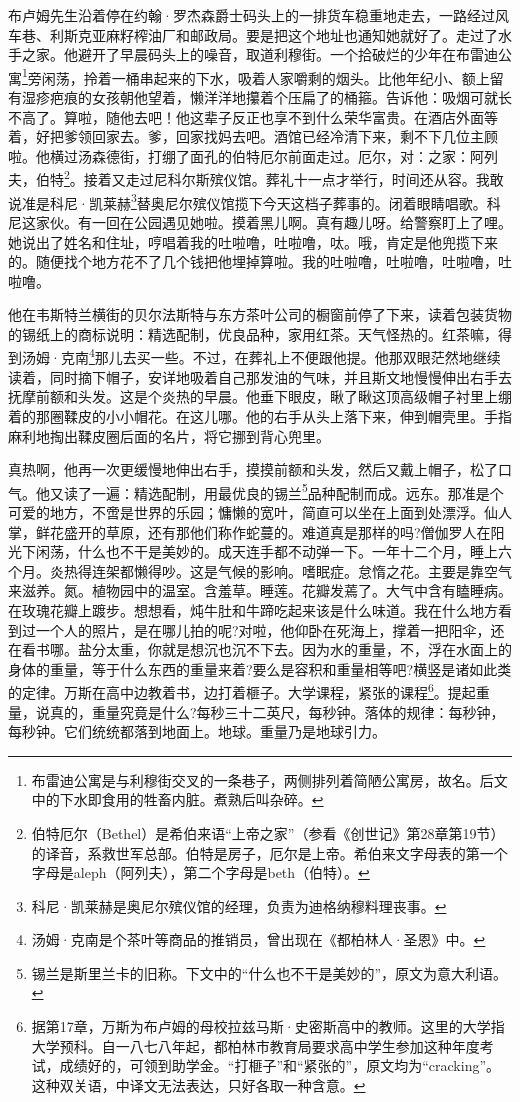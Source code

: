 \par 布卢姆先生沿着停在约翰·罗杰森爵士码头上的一排货车稳重地走去，一路经过风车巷、利斯克亚麻籽榨油厂和邮政局。要是把这个地址也通知她就好了。走过了水手之家。他避开了早晨码头上的噪音，取道利穆街。一个拾破烂的少年在布雷迪公寓\footnote{布雷迪公寓是与利穆街交叉的一条巷子，两侧排列着简陋公寓房，故名。后文中的下水即食用的牲畜内脏。煮熟后叫杂碎。}旁闲荡，拎着一桶串起来的下水，吸着人家嚼剩的烟头。比他年纪小、额上留有湿疹疤痕的女孩朝他望着，懒洋洋地攥着个压扁了的桶箍。告诉他：吸烟可就长不高了。算啦，随他去吧！他这辈子反正也享不到什么荣华富贵。在酒店外面等着，好把爹领回家去。爹，回家找妈去吧。酒馆已经冷清下来，剩不下几位主顾啦。他横过汤森德街，打绷了面孔的伯特厄尔前面走过。厄尔，对：之家：阿列夫，伯特\footnote{伯特厄尔（Bethel）是希伯来语“上帝之家”（参看《创世记》第28章第19节）的译音，系救世军总部。伯特是房子，厄尔是上帝。希伯来文字母表的第一个字母是aleph（阿列夫），第二个字母是beth（伯特）。}。接着又走过尼科尔斯殡仪馆。葬礼十一点才举行，时间还从容。我敢说准是科尼·凯莱赫\footnote{科尼·凯莱赫是奥尼尔殡仪馆的经理，负责为迪格纳穆料理丧事。}替奥尼尔殡仪馆揽下今天这档子葬事的。闭着眼睛唱歌。科尼这家伙。有一回在公园遇见她啦。摸着黑儿啊。真有趣儿呀。给警察盯上了哩。她说出了姓名和住址，哼唱着我的吐啦噜，吐啦噜，呔。哦，肯定是他兜揽下来的。随便找个地方花不了几个钱把他埋掉算啦。我的吐啦噜，吐啦噜，吐啦噜，吐啦噜。
\par 他在韦斯特兰横街的贝尔法斯特与东方茶叶公司的橱窗前停了下来，读着包装货物的锡纸上的商标说明：精选配制，优良品种，家用红茶。天气怪热的。红茶嘛，得到汤姆·克南\footnote{汤姆·克南是个茶叶等商品的推销员，曾出现在《都柏林人·圣恩》中。}那儿去买一些。不过，在葬礼上不便跟他提。他那双眼茫然地继续读着，同时摘下帽子，安详地吸着自己那发油的气味，并且斯文地慢慢伸出右手去抚摩前额和头发。这是个炎热的早晨。他垂下眼皮，瞅了瞅这顶高级帽子衬里上绷着的那圈鞣皮的小小帽花。在这儿哪。他的右手从头上落下来，伸到帽壳里。手指麻利地掏出鞣皮圈后面的名片，将它挪到背心兜里。
\par 真热啊，他再一次更缓慢地伸出右手，摸摸前额和头发，然后又戴上帽子，松了口气。他又读了一遍：精选配制，用最优良的锡兰\footnote{锡兰是斯里兰卡的旧称。下文中的“什么也不干是美妙的”，原文为意大利语。}品种配制而成。远东。那准是个可爱的地方，不啻是世界的乐园；慵懒的宽叶，简直可以坐在上面到处漂浮。仙人掌，鲜花盛开的草原，还有那他们称作蛇蔓的。难道真是那样的吗?僧伽罗人在阳光下闲荡，什么也不干是美妙的。成天连手都不动弹一下。一年十二个月，睡上六个月。炎热得连架都懒得吵。这是气候的影响。嗜眠症。怠惰之花。主要是靠空气来滋养。氮。植物园中的温室。含羞草。睡莲。花瓣发蔫了。大气中含有瞌睡病。在玫瑰花瓣上踱步。想想看，炖牛肚和牛蹄吃起来该是什么味道。我在什么地方看到过一个人的照片，是在哪儿拍的呢?对啦，他仰卧在死海上，撑着一把阳伞，还在看书哪。盐分太重，你就是想沉也沉不下去。因为水的重量，不，浮在水面上的身体的重量，等于什么东西的重量来着?要么是容积和重量相等吧?横竖是诸如此类的定律。万斯在高中边教着书，边打着榧子。大学课程，紧张的课程\footnote{据第17章，万斯为布卢姆的母校拉兹马斯·史密斯高中的教师。这里的大学指大学预科。自一八七八年起，都柏林市教育局要求高中学生参加这种年度考试，成绩好的，可领到助学金。“打榧子”和“紧张的”，原文均为“cracking”。这种双关语，中译文无法表达，只好各取一种含意。}。提起重量，说真的，重量究竟是什么?每秒三十二英尺，每秒钟。落体的规律：每秒钟，每秒钟。它们统统都落到地面上。地球。重量乃是地球引力。
